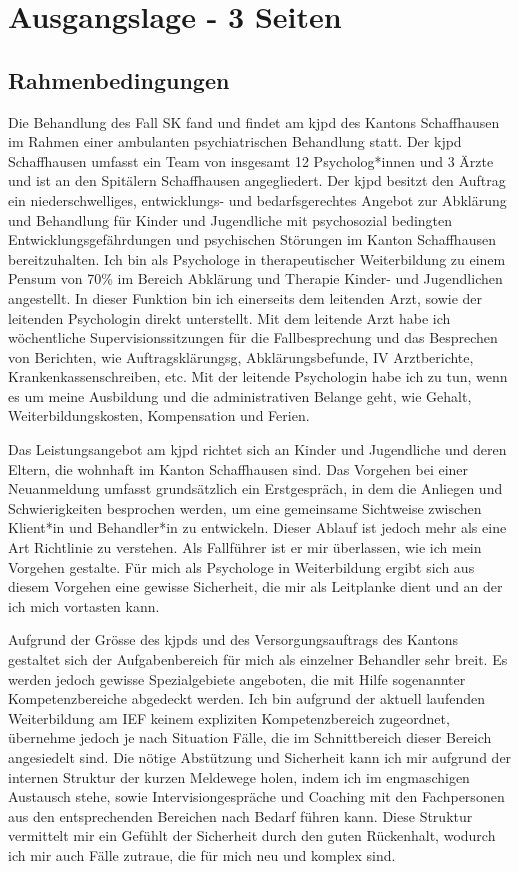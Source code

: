 \section{Ausgangslage - 3 Seiten}
\subsection{Rahmenbedingungen}
Die Behandlung des Fall SK fand und findet am \ac{kjpd} des Kantons Schaffhausen im Rahmen einer ambulanten psychiatrischen Behandlung statt. Der \ac{kjpd} Schaffhausen umfasst ein Team von insgesamt 12 Psycholog*innen und 3 Ärzte und ist an den Spitälern Schaffhausen angegliedert. Der \ac{kjpd} besitzt den Auftrag ein niederschwelliges, entwicklungs- und bedarfsgerechtes Angebot zur Abklärung und Behandlung für Kinder und Jugendliche mit psychosozial bedingten Entwicklungsgefährdungen und psychischen Störungen im Kanton Schaffhausen bereitzuhalten. Ich bin als Psychologe in therapeutischer Weiterbildung zu einem Pensum von 70\% im Bereich Abklärung und Therapie Kinder- und Jugendlichen angestellt. In dieser Funktion bin ich einerseits dem leitenden Arzt, sowie der leitenden Psychologin direkt unterstellt. Mit dem leitende Arzt habe ich wöchentliche Supervisionssitzungen für die Fallbesprechung und das Besprechen von Berichten, wie Auftragsklärungsg,  Abklärungsbefunde, IV Arztberichte, Krankenkassenschreiben, etc. Mit der leitende Psychologin habe ich zu tun, wenn es um meine Ausbildung und die administrativen Belange geht, wie Gehalt, Weiterbildungskosten, Kompensation und Ferien. 

Das Leistungsangebot am \ac{kjpd} richtet sich an Kinder und Jugendliche und deren Eltern, die wohnhaft im Kanton Schaffhausen sind. Das Vorgehen bei einer Neuanmeldung umfasst grundsätzlich ein Erstgespräch, in dem die Anliegen und Schwierigkeiten besprochen werden, um eine gemeinsame Sichtweise zwischen Klient*in und Behandler*in zu entwickeln. Dieser Ablauf ist jedoch mehr als eine Art Richtlinie zu verstehen. Als Fallführer ist er mir überlassen, wie ich mein Vorgehen gestalte. Für mich als Psychologe in Weiterbildung ergibt sich aus diesem Vorgehen eine gewisse Sicherheit, die mir als Leitplanke dient und an der ich mich vortasten kann. 

Aufgrund der Grösse des \ac{kjpd}s und des Versorgungsauftrags des Kantons gestaltet sich der Aufgabenbereich für mich als einzelner Behandler sehr breit. Es werden jedoch gewisse Spezialgebiete angeboten, die mit Hilfe sogenannter Kompetenzbereiche abgedeckt werden. Ich bin aufgrund der aktuell laufenden Weiterbildung am IEF keinem expliziten Kompetenzbereich zugeordnet, übernehme jedoch je nach Situation Fälle, die im Schnittbereich dieser Bereich angesiedelt sind. Die nötige Abstützung und Sicherheit kann ich mir aufgrund der internen Struktur der kurzen Meldewege holen, indem ich im engmaschigen Austausch stehe, sowie Intervisiongespräche und Coaching mit den Fachpersonen aus den entsprechenden Bereichen nach Bedarf führen kann. Diese Struktur vermittelt mir ein Gefühlt der Sicherheit durch den guten Rückenhalt, wodurch ich mir auch Fälle zutraue, die für mich neu und komplex sind. 

